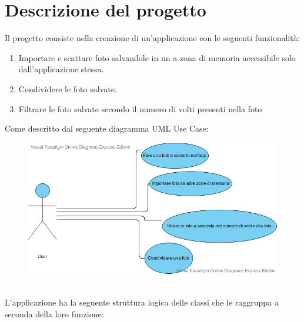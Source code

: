 \documentclass{article}
\begin{document}
\section{Descrizione del progetto}
Il progetto consiste nella creazione di un'applicazione con le seguenti funzionalità:
\begin{enumerate}
    \item Importare e scattare foto salvandole in un a zona di memoria accessibile solo dall'applicazione stessa.
    \item Condividere le foto salvate.
    \item Filtrare le foto salvate secondo il numero di volti presenti nella foto
\end{enumerate}
Come descritto dal seguente diagramma UML Use Case:
\begin{figure}[h!]
    \centering
    \includegraphics[width=150mm]{images/Use_Case_progetto.jpg}
    \label{fig:my_label}
\end{figure}
\\ L'applicazione ha la seguente struttura logica delle classi che le raggruppa a seconda della loro funzione:
\end{document}
